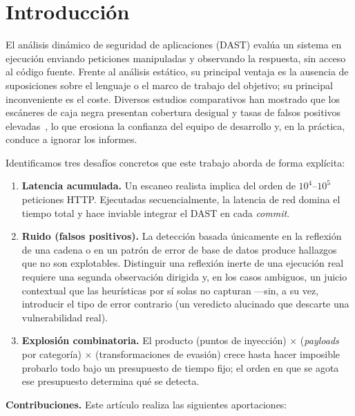 
\section{Introducción}
\label{sec:intro}

El análisis dinámico de seguridad de aplicaciones (DAST) evalúa un sistema en
ejecución enviando peticiones manipuladas y observando la respuesta, sin
acceso al código fuente. Frente al análisis estático, su principal ventaja es
la ausencia de suposiciones sobre el lenguaje o el marco de trabajo del
objetivo; su principal inconveniente es el coste. Diversos estudios
comparativos han mostrado que los escáneres de caja negra presentan cobertura
desigual y tasas de falsos positivos
elevadas~\cite{doupe2010johnny,bau2010state,parvez2015analysis}, lo que erosiona
la confianza del equipo de desarrollo y, en la práctica, conduce a ignorar los
informes.

Identificamos tres desafíos concretos que este trabajo aborda de forma
explícita:

\begin{enumerate}
  \item \textbf{Latencia acumulada.} Un escaneo realista implica del orden de
  $10^4$--$10^5$ peticiones HTTP. Ejecutadas secuencialmente, la latencia de
  red domina el tiempo total y hace inviable integrar el DAST en cada
  \emph{commit}.
  \item \textbf{Ruido (falsos positivos).} La detección basada únicamente en
  la reflexión de una cadena o en un patrón de error de base de datos produce
  hallazgos que no son explotables. Distinguir una reflexión inerte de una
  ejecución real requiere una segunda observación dirigida y, en los casos
  ambiguos, un juicio contextual que las heurísticas por sí solas no capturan
  ---sin, a su vez, introducir el tipo de error contrario (un veredicto
  alucinado que descarte una vulnerabilidad real).
  \item \textbf{Explosión combinatoria.} El producto (puntos de inyección)
  $\times$ (\emph{payloads} por categoría) $\times$ (transformaciones de
  evasión) crece hasta hacer imposible probarlo todo bajo un presupuesto de
  tiempo fijo; el orden en que se agota ese presupuesto determina qué se
  detecta.
\end{enumerate}

\noindent\textbf{Contribuciones.} Este artículo realiza las siguientes
aportaciones:

